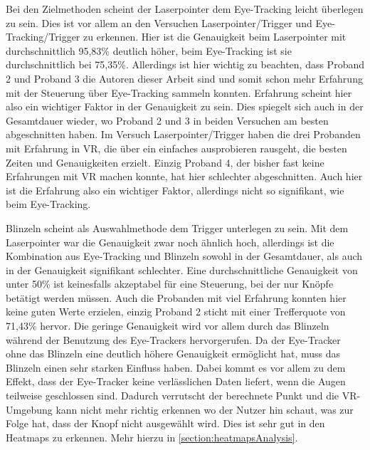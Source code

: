 Bei den Zielmethoden scheint der Laserpointer dem Eye-Tracking leicht überlegen zu sein. Dies ist vor allem an den Versuchen Laserpointer/Trigger und Eye-Tracking/Trigger zu erkennen. Hier ist die Genauigkeit beim Laserpointer mit durchschnittlich 95,83\% deutlich höher, beim Eye-Tracking ist sie durchschnittlich bei 75,35\%. Allerdings ist hier wichtig zu beachten, dass Proband 2 und Proband 3 die Autoren dieser Arbeit sind und somit schon mehr Erfahrung mit der Steuerung über Eye-Tracking sammeln konnten. Erfahrung scheint hier also ein wichtiger Faktor in der Genauigkeit zu sein. Dies spiegelt sich auch in der Gesamtdauer wieder, wo Proband 2 und 3 in beiden Versuchen am besten abgeschnitten haben. Im Versuch Laserpointer/Trigger haben die drei Probanden mit Erfahrung in VR, die über ein einfaches ausprobieren rausgeht, die besten Zeiten und Genauigkeiten erzielt. Einzig Proband 4, der bisher fast keine Erfahrungen mit VR machen konnte, hat hier schlechter abgeschnitten. Auch hier ist die Erfahrung also ein wichtiger Faktor, allerdings nicht so signifikant, wie beim Eye-Tracking. 

Blinzeln scheint als Auswahlmethode dem Trigger unterlegen zu sein. Mit dem Laserpointer war die Genauigkeit zwar noch ähnlich hoch, allerdings ist die Kombination aus Eye-Tracking und Blinzeln sowohl in der Gesamtdauer, als auch in der Genauigkeit signifikant schlechter. Eine durchschnittliche Genauigkeit von unter 50\% ist keinesfalls akzeptabel für eine Steuerung, bei der nur Knöpfe betätigt werden müssen. Auch die Probanden mit viel Erfahrung konnten hier keine guten Werte erzielen, einzig Proband 2 sticht mit einer Trefferquote von 71,43\% hervor. Die geringe Genauigkeit wird vor allem durch das Blinzeln während der Benutzung des Eye-Trackers hervorgerufen. Da der Eye-Tracker ohne das Blinzeln eine deutlich höhere Genauigkeit ermöglicht hat, muss das Blinzeln einen sehr starken Einfluss haben. Dabei kommt es vor allem zu dem Effekt, dass der Eye-Tracker keine verlässlichen Daten liefert, wenn die Augen teilweise geschlossen sind. Dadurch verrutscht der berechnete Punkt und die VR-Umgebung kann nicht mehr richtig erkennen wo der Nutzer hin schaut, was zur Folge hat, dass der Knopf nicht ausgewählt wird. Dies ist sehr gut in den Heatmaps zu erkennen. Mehr hierzu in \autoref{section:heatmapsAnalysis}. 

